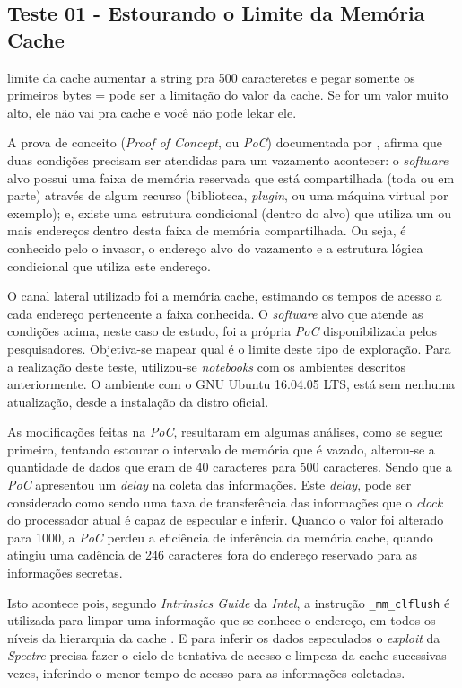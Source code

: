 \documentclass[
	article,			    %
	12pt,				    %
	oneside,			    %
	a4paper,			    %
	chapter=TITLE,		    %
	section=TITLE,		    %
	subsection=TITLE,	    %
	english,			    %
	brazil,				    %
	sumario=tradicional
]{abntex2}
\begin{document}
\subsection{Teste 01 - Estourando o Limite da Memória Cache}

limite da cache
aumentar a string pra 500 caracteretes e pegar somente os primeiros bytes = pode ser a limitação do valor da cache. Se for um valor muito alto, ele não vai pra cache e você não pode lekar ele.

A prova de conceito (\emph{Proof of Concept}, ou \emph{PoC}) documentada por , afirma que duas condições precisam ser atendidas para um vazamento acontecer: o \emph{software} alvo possui uma faixa de memória reservada que está compartilhada (toda ou em parte) através de algum recurso (biblioteca, \emph{plugin}, ou uma máquina virtual por exemplo); e, existe uma estrutura condicional (dentro do alvo) que utiliza um ou mais endereços dentro desta faixa de memória compartilhada. Ou seja, é conhecido pelo o invasor, o endereço alvo do vazamento e a estrutura lógica condicional que utiliza este endereço. 

O canal lateral utilizado foi a memória cache, estimando os tempos de acesso a cada endereço pertencente a faixa conhecida. O \emph{software} alvo que atende as condições acima, neste caso de estudo, foi a própria \emph{PoC} disponibilizada pelos pesquisadores. Objetiva-se mapear qual é o limite deste tipo de exploração. Para a realização deste teste, utilizou-se \emph{notebooks} com os ambientes descritos anteriormente. O ambiente com o GNU Ubuntu 16.04.05 LTS, está sem nenhuma atualização, desde a instalação da distro oficial.

As modificações feitas na \emph{PoC}, resultaram em algumas análises, como se segue: primeiro, tentando estourar o intervalo de memória que é vazado, alterou-se a quantidade de dados que eram de 40 caracteres para 500 caracteres. Sendo que a \emph{PoC} apresentou um \emph{delay} na coleta das informações. Este \emph{delay}, pode ser considerado como sendo uma taxa de transferência das informações que o \emph{clock} do processador atual é capaz de especular e inferir. Quando o valor foi alterado para 1000, a \emph{PoC} perdeu a eficiência de inferência da memória cache, quando atingiu uma cadência de 246 caracteres fora do endereço reservado para as informações secretas. 

Isto acontece pois, segundo \emph{Intrinsics Guide} da \emph{Intel}, a instrução \verb|_mm_clflush| é utilizada para limpar uma informação que se conhece o endereço, em todos os níveis da hierarquia da cache \cite{intel-iguide}. E para inferir os dados especulados o \emph{exploit} da \emph{Spectre} precisa fazer o ciclo de tentativa de acesso e limpeza da cache sucessivas vezes, inferindo o menor tempo de acesso para as informações coletadas.
\end{document}
